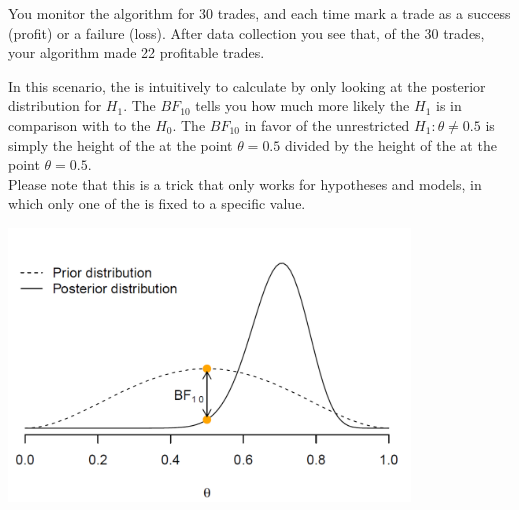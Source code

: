 
You monitor the algorithm for 30 trades, and each time mark a trade as a success (profit) or a failure (loss). After data collection you see that, of the 30 trades, your algorithm made 22 profitable trades. \\


\emptyanswerbox{
    $\alpha$: \shortanswerline \hspace*{3cm} $\beta$: \shortanswerline
}

\clearpage %



In this scenario, the  is intuitively to calculate by only looking at the posterior distribution for $H_1$. The  $BF_{10}$ tells you how much more likely the  $H_1$ is in comparison with to the  $H_0$. The  $BF_{10}$ in favor of the unrestricted  $H_1: \theta \neq 0.5$ is simply the height of the  at the point $\theta = 0.5$ divided by the height of the  at the point $\theta = 0.5$. \\

Please note that this is a trick that only works for  hypotheses and models, in which only one of the  is fixed to a specific value. \\

\begin{center}
    \includegraphics[width=0.8\textwidth]{Files/Images/priorAndPosterior.pdf}
\end{center}

